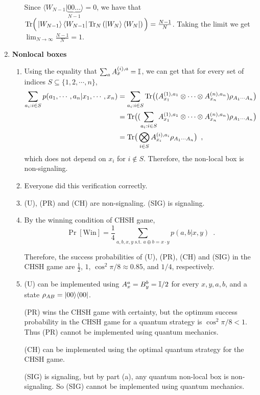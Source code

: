 \documentclass[12pt]{article}
\begin{document}
\begin{enumerate}
\begin{enumerate}
	Since $\langle W_{N-1}|\underbrace{00\ldots}_{N-1}\rangle = 0$, we have that $\mathrm{Tr}\Big(\left| W_{N-1} \right\rangle \left\langle W_{N-1} \right| \mathrm{Tr}_N\left(\left| W_N \right\rangle \left\langle W_N \right|\right)\Big) = \frac{N-1}{N}$. Taking the limit we get $\lim_{N\rightarrow\infty}\frac{N-1}{N} = 1$.
\end{enumerate}

\item {\bf Nonlocal boxes}
\begin{enumerate}
\item Using the equality that $\sum_{a}A_x^{(i), a} = \mathbb{I}$, we can get that for every set of indices $S \subseteq \{1, 2, \cdots, n\}$,
\begin{align*}
\sum_{a_i: i \in S}p(a_1, \cdots, a_n | x_1, \cdots, x_n) &= \sum_{a_i: i \in S}	\mathrm{Tr}\big( (A_{x_1}^{(1),a_1} \otimes \cdots\otimes A_{x_n}^{(n),a_n}) \rho_{A_1\cdots A_n}\big)\\
&= \mathrm{Tr}\big( (\sum_{a_i: i \in S}A_{x_1}^{(1),a_1} \otimes \cdots\otimes A_{x_n}^{(n),a_n}) \rho_{A_1\cdots A_n}\big)\\
&= \mathrm{Tr}\big( \bigotimes_{i \in S} A_{x_i}^{(i),a_i} \rho_{A_1\cdots A_n} \big)\enspace,
\end{align*}
which does not depend on $x_i$ for $i \notin S$. Therefore, the non-local box is non-signaling.
\item Everyone did this verification correctly.
\item (U), (PR) and (CH) are non-signaling. (SIG) is signaling.
\item By the winning condition of CHSH game, 
\[\Pr\left[\text{Win}\right] = \frac{1}{4}\sum_{a, b, x, y \text{ s.t. }a \oplus b = x \cdot y}p(a, b| x, y)\enspace.\]

Therefore, the success probabilities of (U), (PR), (CH) and (SIG) in the CHSH game are $\frac{1}{2}$, $1$, $\cos^2 \pi / 8 \approx 0.85$, and $1/4$, respectively.

\item (U) can be implemented using $A_x^a = B_y^b = \mathbb{I}/2$ for every $x, y, a, b$, and a state $\rho_{AB} = \ket{00}\!\bra{00}$.

(PR) wins the CHSH game with certainty, but the optimum success probability in the CHSH game for a quantum strategy is $\cos^2 \pi/8 < 1$. Thus (PR) cannot be implemented using quantum mechanics.

(CH) can be implemented using the optimal quantum strategy for the CHSH game.

(SIG) is signaling, but by part (a), any quantum non-local box is non-signaling. So (SIG) cannot be implemented using quantum mechanics.


\end{enumerate}
\end{enumerate}
\end{document}
